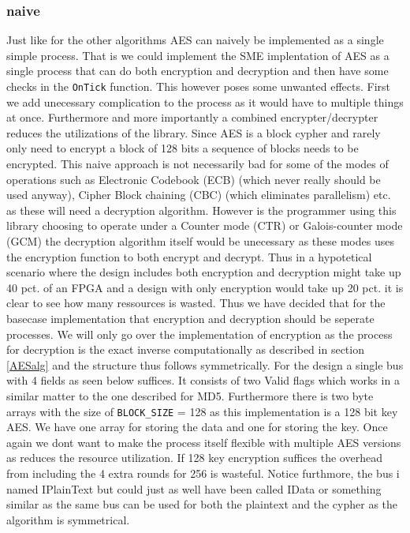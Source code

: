 \documentclass[a4paper]{article}
\begin{document}
\subsubsection{naive}
\label{AESnaive}
Just like for the other algorithms AES can naively be implemented as a single simple process. That is we could implement the SME implentation of AES as a single process that can do both encryption and decryption and then have some checks in the \texttt{OnTick} function. This however poses some unwanted effects. First we add unecessary complication to the process as it would have to multiple things at once. Furthermore and more importantly a combined encrypter/decrypter reduces the utilizations of the library. Since AES is a block cypher and rarely only need to encrypt a block of 128 bits a sequence of blocks needs to be encrypted. This naive approach is not necessarily bad for some of the modes of operations such as Electronic Codebook (ECB) (which never really should be used anyway), Cipher Block chaining (CBC) (which eliminates parallelism) etc. as these will need a decryption algorithm. However is the programmer using this library choosing to operate under a Counter mode (CTR) or Galois-counter mode (GCM) the decryption algorithm itself would be unecessary as these modes uses the encryption function to both encrypt and decrypt. Thus in a hypotetical scenario where the design includes both encryption and decryption might take up 40 pct. of an FPGA and a design with only encryption would take up 20 pct. it is clear to see how many ressources is wasted. Thus we have decided that for the basecase implementation that encryption and decryption should be seperate processes. We will only go over the implementation of encryption as the process for decryption is the exact inverse computationally as described in section \ref{AESalg} and the structure thus follows symmetrically. For the design a single bus with 4 fields as seen below suffices. It consists of two Valid flags which works in a similar matter to the one described for MD5. Furthermore there is two byte arrays with the size of \texttt{BLOCK\_SIZE} = 128 as this implementation is a 128 bit key AES. We have one array for storing the data and one for storing the key. Once again we dont want to make the process itself flexible with multiple AES versions as reduces the resource utilization. If 128 key encryption suffices the overhead from including the 4 extra rounds for 256 is wasteful. Notice furthmore, the bus i named IPlainText but could just as well have been called IData or something similar as the same bus can be used for both the plaintext and the cypher as the algorithm is symmetrical.
\end{document}

